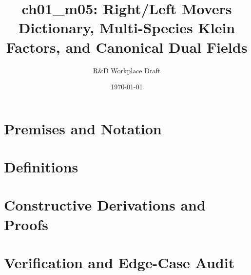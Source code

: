 \documentclass[11pt,a4paper]{article}
\title{\textbf{ch01\_m05: Right/Left Movers Dictionary, Multi-Species Klein Factors, and Canonical Dual Fields}}
\author{R\&D Workplace Draft}
\date{\today}
\theoremstyle{definition}
\theoremstyle{plain}
\theoremstyle{remark}
\begin{document}
\maketitle

\section{Premises and Notation}

\section{Definitions}

\section{Constructive Derivations and Proofs}

\section{Verification and Edge-Case Audit}
\end{document}
